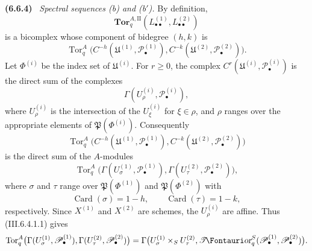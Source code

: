 \documentclass[10pt,oneside]{book}
\newcommand{\sh}[1]{\mathscr{#1}}
\newcommand{\shTor}{\sh{T}\textup{\kern-2.2pt{\Fontauri\slshape or}}}
\newcommand{\Tor}{\operatorname{Tor}}
\newcommand{\sref}[2][]{(#2)}
\newcommand{\oldpage}[2][]{\setcounter{footnote}{0}\marginpar{\scriptsize\textbf{#1}~|~#2}\ignorespaces}
\newenvironment{env}[1][]{\par\medskip\noindent\textbf{(#1)}\ }{\par}
\begin{document}
\begin{env}[6.6.4]
\label{III.6.6.4}
\emph{Spectral sequences \textnormal{(b)} and
\textnormal{(b$'$)}.}
By definition,
\[
  \mathbf{Tor}_q^{A,\mathrm{II}}
  (L_{\bullet\bullet}^{(1)},L_{\bullet\bullet}^{(2)})
\]
is a bicomplex whose component of bidegree $(h,k)$ is
\[
  \Tor_q^A
  \bigl(
    C^{-h}(\mathfrak U^{(1)},\sh P_\bullet^{(1)}),
    C^{-k}(\mathfrak U^{(2)},\sh P_\bullet^{(2)})
  \bigr).
\]
Let $\Phi^{(i)}$ be the index set of $\mathfrak U^{(i)}$.  For
$r\geq0$, the complex
$C^r(\mathfrak U^{(i)},\sh P_\bullet^{(i)})$ is the direct sum
of the complexes
\[
  \Gamma(U_\rho^{(i)},\sh P_\bullet^{(i)}),
\]
where $U_\rho^{(i)}$ is the intersection of the
$U_\xi^{(i)}$ for $\xi\in\rho$, and $\rho$ ranges over the
appropriate elements of $\mathfrak P(\Phi^{(i)})$.
Consequently
\[
  \Tor_q^A
  \bigl(
    C^{-h}(\mathfrak U^{(1)},\sh P_\bullet^{(1)}),
    C^{-k}(\mathfrak U^{(2)},\sh P_\bullet^{(2)})
  \bigr)
\]
is the direct sum of the $A$-modules
\[
  \Tor_q^A
  \bigl(
    \Gamma(U_\sigma^{(1)},\sh P_\bullet^{(1)}),
    \Gamma(U_\tau^{(2)},\sh P_\bullet^{(2)})
  \bigr),
\]
where $\sigma$ and $\tau$ range over
$\mathfrak P(\Phi^{(1)})$ and $\mathfrak P(\Phi^{(2)})$ with
\[
  \operatorname{Card}(\sigma)=1-h,
  \qquad
  \operatorname{Card}(\tau)=1-k,
\]
respectively.  Since $X^{(1)}$ and $X^{(2)}$ are schemes, the
$U_\rho^{(i)}$ are affine.  Thus \sref{III.6.4.1.1} gives
\[
  \Tor_q^A
  \bigl(
    \Gamma(U_\sigma^{(1)},\sh P_\bullet^{(1)}),
    \Gamma(U_\tau^{(2)},\sh P_\bullet^{(2)})
  \bigr)
  =
  \Gamma\bigl(
    U_\sigma^{(1)}\times_SU_\tau^{(2)},
    \shTor_q^S(\sh P_\bullet^{(1)},\sh P_\bullet^{(2)})
  \bigr).
\]

\oldpage[III]{155}


\end{env}
\end{document}
